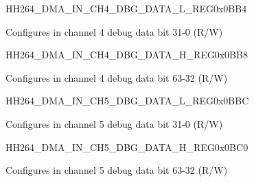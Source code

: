     
    \begin{register}{H}{H264\_DMA\_IN\_CH4\_DBG\_DATA\_L\_REG}{0x0BB4}\label{regdesc:H264DMAINCH4DBGDATALREG}
    \regnewline%
    \begin{regdesc}\begin{reglist}
    \label{fielddesc:H264INCH4DBGDATAL}\item [H264\_IN\_CH4\_DBG\_DATA\_L] Configures in channel 4 debug data bit 31-0 (R/W)
    \end{reglist}\end{regdesc}
    \end{register}
    
    
    \begin{register}{H}{H264\_DMA\_IN\_CH4\_DBG\_DATA\_H\_REG}{0x0BB8}\label{regdesc:H264DMAINCH4DBGDATAHREG}
    \regnewline%
    \begin{regdesc}\begin{reglist}
    \label{fielddesc:H264INCH4DBGDATAH}\item [H264\_IN\_CH4\_DBG\_DATA\_H] Configures in channel 4 debug data bit 63-32 (R/W)
    \end{reglist}\end{regdesc}
    \end{register}
    
    
    \begin{register}{H}{H264\_DMA\_IN\_CH5\_DBG\_DATA\_L\_REG}{0x0BBC}\label{regdesc:H264DMAINCH5DBGDATALREG}
    \regnewline%
    \begin{regdesc}\begin{reglist}
    \label{fielddesc:H264INCH5DBGDATAL}\item [H264\_IN\_CH5\_DBG\_DATA\_L] Configures in channel 5 debug data bit 31-0 (R/W)
    \end{reglist}\end{regdesc}
    \end{register}
    
    
    \begin{register}{H}{H264\_DMA\_IN\_CH5\_DBG\_DATA\_H\_REG}{0x0BC0}\label{regdesc:H264DMAINCH5DBGDATAHREG}
    \regnewline%
    \begin{regdesc}\begin{reglist}
    \label{fielddesc:H264INCH5DBGDATAH}\item [H264\_IN\_CH5\_DBG\_DATA\_H] Configures in channel 5 debug data bit 63-32 (R/W)
    \end{reglist}\end{regdesc}
    \end{register}
    
